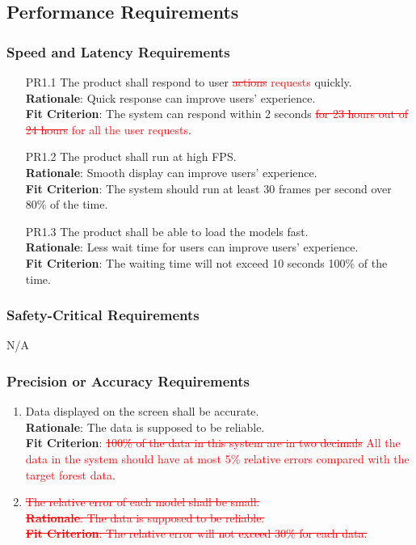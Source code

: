 \documentclass{article}
\begin{document}
\subsection{Performance Requirements}
\subsubsection{Speed and Latency Requirements}
\begin{enumerate}
    \item[PR1.1] The product shall respond to user \textcolor{red}{\st{actions} requests} quickly.\\
    \textbf{Rationale}: Quick response can improve users' experience.\\
    \textbf{Fit Criterion}: The system can respond within 2 seconds \textcolor{red}{\st{for 23 hours
     out of 24 hours} for all the user requests}.
    
    \item[PR1.2] The product shall run at high FPS.\\
    \textbf{Rationale}: Smooth display can improve users' experience.\\
    \textbf{Fit Criterion}: The system should run at least 30 frames per second over 80\% of the time.
    
    \item[PR1.3] The product shall be able to load the models fast.\\
    \textbf{Rationale}: Less wait time for users can improve users' experience.\\
    \textbf{Fit Criterion}: The waiting time will not exceed 10 seconds 100\% of the time.
\end{enumerate}
\subsubsection{Safety-Critical Requirements}
N/A
\subsubsection{Precision or Accuracy Requirements}
\begin{enumerate}[PR3.1]
    \item Data displayed on the screen shall be accurate.\\
    \textbf{Rationale}: The data is supposed to be reliable.\\
    \textbf{Fit Criterion}: \textcolor{red}{\st{100\% of the data in this system are in two decimals}
    All the data in the system should have at most 5\% relative errors compared with the target
    forest data}.\\
 
   
    \item \textcolor{red}{\st{The relative error of each model shall be small. \\
    \textbf{Rationale}: The data is supposed to be reliable.\\
    \textbf{Fit Criterion}: The relative error will not exceed 30\% for each data.}}\\
    
\end{enumerate}
\end{document}
